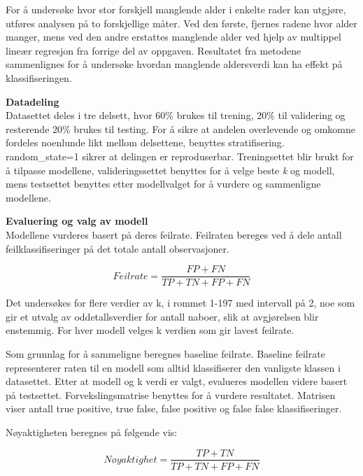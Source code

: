 For å undersøke hvor stor forskjell manglende alder i enkelte rader kan utgjøre, utføres analysen på to forskjellige måter. Ved den første, fjernes radene hvor alder manger, mens ved den andre erstattes manglende alder ved hjelp av multippel lineær regresjon fra forrige del av oppgaven. Resultatet fra metodene sammenlignes for å undersøke hvordan manglende aldersverdi kan ha effekt på klassifiseringen.

\textbf{Datadeling} \\
Datasettet deles i tre delsett, hvor 60\% brukes til trening, 20\% til validering og resterende 20\% brukes til testing. For å sikre at andelen overlevende og omkomne fordeles noenlunde likt mellom delsettene, benyttes stratifisering. random\_state=1 sikrer at delingen er reproduserbar. Treningsettet blir brukt for å tilpasse modellene, valideringssettet benyttes for å velge beste \textit{k} og modell, mens testsettet benyttes etter modellvalget for å vurdere og sammenligne modellene.

\textbf{Evaluering og valg av modell} \\
Modellene vurderes basert på deres feilrate. Feilraten bereges ved å dele antall feilklassifiseringer på det totale antall observasjoner.

$$Feilrate = \frac{FP + FN}{TP + TN + FP + FN}$$

Det undersøkes for flere verdier av k, i rommet 1-197 med intervall på 2, noe som gir et utvalg av oddetallsverdier for antall naboer, slik at avgjørelsen blir enstemmig. For hver modell velges k verdien som gir lavest feilrate. 


Som grunnlag for å sammeligne beregnes baseline feilrate. Baseline feilrate representerer raten til en modell som alltid klassifiserer den vanligste klassen i datasettet. Etter at modell og k verdi er valgt, evalueres modellen videre basert på testsettet. Forvekslingsmatrise benyttes for å vurdere resultatet. Matrisen viser antall true positive, true false, false positive og false false klassifiseringer.

Nøyaktigheten beregnes på følgende vis:

$$Nøyaktighet = \frac{TP+TN}{TP+TN+FP+FN}$$


